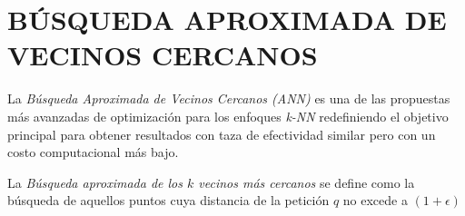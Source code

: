 \section{BÚSQUEDA APROXIMADA DE VECINOS CERCANOS}

La \textit{Búsqueda Aproximada de Vecinos Cercanos (ANN)} es una de las propuestas más avanzadas de optimización para los enfoques \textit{k-NN} redefiniendo el objetivo principal para obtener resultados con taza de efectividad similar pero con un costo computacional más bajo.

\begin{definition}
    La \textit{Búsqueda aproximada de los $k$ vecinos más cercanos} se define como la búsqueda de aquellos puntos cuya distancia de la petición $q$ no excede a $(1 + \epsilon)$ 
\end{definition}
